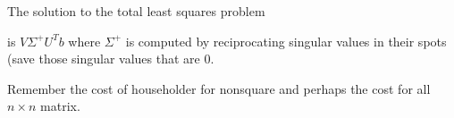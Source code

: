 \documentclass[../main.tex]{subfiles}
\begin{document}
\begin{definition}
    The solution to the total least squares problem

    is $V \Sigma^{+} U^T b$ where $\Sigma^{+}$ is computed by reciprocating singular values in their spots (save those singular values that are $0$.
\end{definition}

\begin{remark}
    Remember the cost of householder for nonsquare
    and perhaps the cost for all $n \times n$ matrix.
\end{remark}
\end{document}
